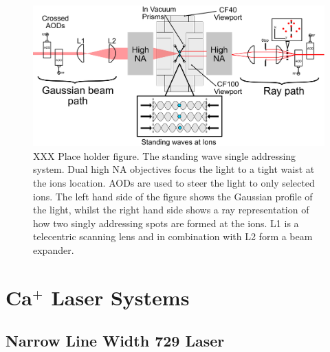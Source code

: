 \begin{figure}
  \begin{center}
   \noindent\includegraphics[width=\linewidth]{figures/pdf_figure/vac_can_AOD_small.pdf}
  \end{center}
  \caption{XXX Place holder figure. The standing wave single addressing system. Dual high NA
    objectives focus the light to a tight waist at the ions
    location. AODs are used to steer the light to only selected
    ions. The left hand side of the figure shows the Gaussian profile
    of the light, whilst the right hand side shows a ray
    representation of how two singly addressing spots are formed at
    the ions. L1 is a telecentric scanning lens and in combination
    with L2 form a beam expander.}
  \label{fig:AOD}
\end{figure}

\section{Ca$^+$ Laser Systems}	
\label{sec:Laser systems}

\subsection{Narrow Line Width 729 Laser}
\label{sec:Narrow Line Width 729 Laser} 

